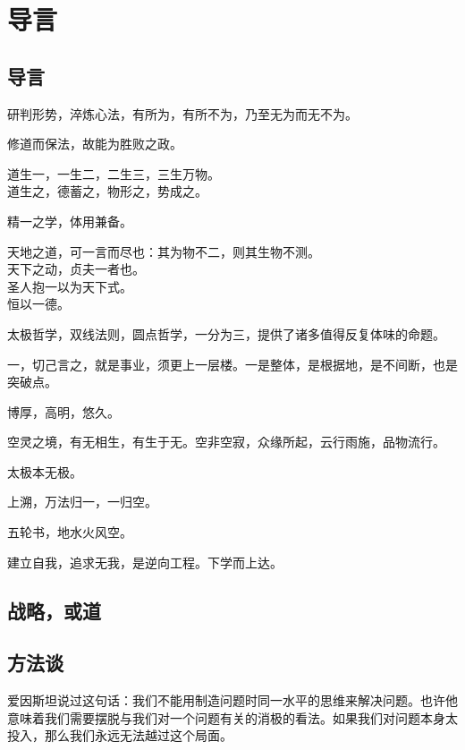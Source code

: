 \chapter{导言}

\section{导言}

研判形势，淬炼心法，有所为，有所不为，乃至无为而无不为。

修道而保法，故能为胜败之政。

\begin{shadequote}

    道生一，一生二，二生三，三生万物。\\
    道生之，德蓄之，物形之，势成之。
\end{shadequote}

精一之学，体用兼备。
\begin{shadequote}

    天地之道，可一言而尽也：其为物不二，则其生物不测。\\
    天下之动，贞夫一者也。\\
    圣人抱一以为天下式。\\
    恒以一德。
\end{shadequote}

太极哲学，双线法则，圆点哲学，一分为三，提供了诸多值得反复体味的命题。

一，切己言之，就是事业，须更上一层楼。一是整体，是根据地，是不间断，也是突破点。

博厚，高明，悠久。

空灵之境，有无相生，有生于无。空非空寂，众缘所起，云行雨施，品物流行。

太极本无极。

上溯，万法归一，一归空。

五轮书，地水火风空。

建立自我，追求无我，是逆向工程。下学而上达。

\section{战略，或道}

\section{方法谈}

爱因斯坦说过这句话：我们不能用制造问题时同一水平的思维来解决问题。也许他意味着我们需要摆脱与我们对一个问题有关的消极的看法。如果我们对问题本身太投入，那么我们永远无法越过这个局面。

